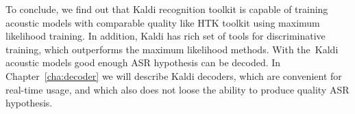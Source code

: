 To conclude, we find out that Kaldi recognition toolkit is capable of training acoustic models with comparable quality 
like \ac{HTK} toolkit using maximum likelihood training. In addition, Kaldi has rich set of tools for discriminative training, 
which outperforms the maximum likelihood methods.
With the~Kaldi acoustic models good enough ASR hypothesis can be decoded. 
In Chapter~\ref{cha:decoder} we will describe Kaldi decoders, which are convenient for real-time usage, 
and which also does not loose the ability to produce quality ASR hypothesis.




